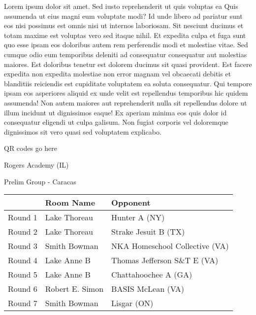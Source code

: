 \documentclass{article}%
\begin{document}
\vspace*{8pt}%
\linebreak%
\newline%
\newline%
Lorem ipsum dolor sit amet. Sed iusto reprehenderit ut quis voluptas ea Quis assumenda ut eius magni eum voluptate modi? Id unde libero ad pariatur sunt eos nisi possimus est omnis nisi ut internos laboriosam. Sit nesciunt ducimus et totam maxime est voluptas vero sed itaque nihil. Et expedita culpa et fuga sunt quo esse ipsam eos doloribus autem rem perferendis modi et molestiae vitae.\newline%
\newline%
Sed cumque odio eum temporibus deleniti ad consequatur consequatur aut molestias maiores. Est doloribus tenetur est dolorem ducimus sit quasi provident. Est facere expedita non expedita molestiae non error magnam vel obcaecati debitis et blanditiis reiciendis est cupiditate voluptatem ea soluta consequatur. Qui tempore ipsam eos asperiores aliquid ex unde velit est repellendus temporibus hic quidem assumenda!\newline%
\newline%
Non autem maiores aut reprehenderit nulla sit repellendus dolore ut illum incidunt ut dignissimos eaque! Ex aperiam minima eos quis dolor id consequatur eligendi ut culpa galisum. Non fugiat corporis vel doloremque dignissimos sit vero quasi sed voluptatem explicabo.\newline%
\newline%
%
\vspace*{30pt}%
\begin{center}%
\begin{Huge}%
QR codes go here%
\end{Huge}%
\end{center}%
\newpage%
%
\begin{center}%
\begin{Huge}%
Rogers Academy (IL)%
\end{Huge}%
\vspace*{8pt}%
\linebreak%
\begin{Large}%
Prelim Group {-} Caracas%
\end{Large}%
\end{center}%
\begin{tabularx}{\textwidth}{|c|Y|Y|}%
\hline%
&Room Name&Opponent\\%
\hline%
Round 1&Lake Thoreau&Hunter A (NY)\\%
Round 2&Lake Thoreau&Strake Jesuit B (TX)\\%
Round 3&Smith Bowman&NKA Homeschool Collective (VA)\\%
Round 4&Lake Anne B&Thomas Jefferson S\&T E (VA)\\%
Round 5&Lake Anne B&Chattahoochee A (GA)\\%
Round 6&Robert E. Simon&BASIS McLean (VA)\\%
Round 7&Smith Bowman&Lisgar (ON)\\%
\hline%
\end{tabularx}%
\end{document}
